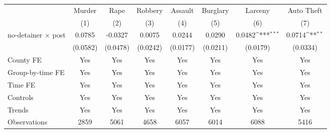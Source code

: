 {
\def\sym#1{\ifmmode^{#1}\else\(^{#1}\)\fi}
\begin{tabular}{l*{7}{c}}
\hline\hline
                    &\multicolumn{1}{c}{Murder}&\multicolumn{1}{c}{Rape}&\multicolumn{1}{c}{Robbery}&\multicolumn{1}{c}{Assault}&\multicolumn{1}{c}{Burglary}&\multicolumn{1}{c}{Larceny}&\multicolumn{1}{c}{Auto Theft}\\\cmidrule(lr){2-2}\cmidrule(lr){3-3}\cmidrule(lr){4-4}\cmidrule(lr){5-5}\cmidrule(lr){6-6}\cmidrule(lr){7-7}\cmidrule(lr){8-8}
                    &\multicolumn{1}{c}{(1)}         &\multicolumn{1}{c}{(2)}         &\multicolumn{1}{c}{(3)}         &\multicolumn{1}{c}{(4)}         &\multicolumn{1}{c}{(5)}         &\multicolumn{1}{c}{(6)}         &\multicolumn{1}{c}{(7)}         \\
\hline
no-detainer $\times$ post&      0.0785         &     -0.0327         &      0.0075         &      0.0244         &      0.0290         &      0.0482\sym{***}&      0.0714\sym{**} \\
                    &    (0.0582)         &    (0.0478)         &    (0.0242)         &    (0.0177)         &    (0.0211)         &    (0.0179)         &    (0.0334)         \\
[1em]
County FE           &         Yes         &         Yes         &         Yes         &         Yes         &         Yes         &         Yes         &         Yes         \\
[1em]
Group-by-time FE    &         Yes         &         Yes         &         Yes         &         Yes         &         Yes         &         Yes         &         Yes         \\
[1em]
Time FE             &         Yes         &         Yes         &         Yes         &         Yes         &         Yes         &         Yes         &         Yes         \\
[1em]
Controls            &         Yes         &         Yes         &         Yes         &         Yes         &         Yes         &         Yes         &         Yes         \\
[1em]
Trends              &         Yes         &         Yes         &         Yes         &         Yes         &         Yes         &         Yes         &         Yes         \\
\hline
Observations        &        2859         &        5061         &        4658         &        6057         &        6014         &        6088         &        5416         \\
\hline\hline
\end{tabular}
}
